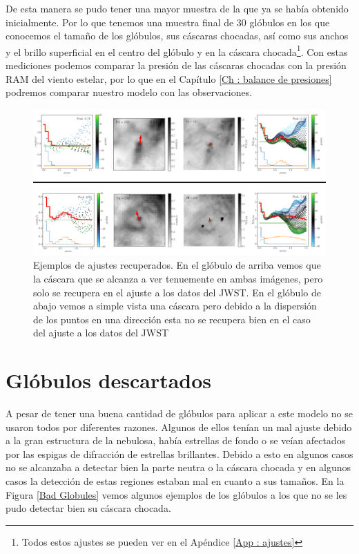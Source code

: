 \documentclass{book}
\begin{document}
De esta manera se pudo tener una mayor muestra de la que ya se había obtenido inicialmente. Por lo que tenemos una muestra final de 30 glóbulos en los que conocemos el tamaño de los glóbulos, sus cáscaras chocadas, así como  sus anchos y el brillo superficial en el centro del glóbulo y en la cáscara chocada\footnote{Todos estos ajustes se pueden ver en el Apéndice \ref{App : ajustes}}. Con estas mediciones podemos comparar la presión de las cáscaras chocadas con la presión RAM del viento estelar, por lo que en el Capítulo \ref{Ch : balance de presiones} podremos comparar nuestro modelo con las observaciones.

\begin{figure}[htb]
    \centering
    \includegraphics[width=\textwidth]{Nuevas imagenes finales/C4_Recuperados_ajustes.pdf}
    \caption{Ejemplos de ajustes recuperados. En el glóbulo de arriba vemos que la cáscara que se alcanza a ver tenuemente en ambas imágenes, pero solo se recupera en el ajuste a los datos del JWST. En el glóbulo de abajo vemos a simple vista una cáscara pero debido a la dispersión de los puntos en una dirección esta no se recupera bien en el caso del ajuste a los datos del JWST}
    \label{Recuperados Globulos}
\end{figure}

\section{Glóbulos descartados}\label{Bad globules}

A pesar de tener una buena cantidad de glóbulos para aplicar a este modelo no se usaron todos por diferentes razones. 
Algunos de ellos tenían un mal ajuste debido a la gran estructura de la nebulosa, había estrellas de fondo o se veían afectados por las espigas de difracción de estrellas brillantes.  Debido a esto en algunos casos no se alcanzaba a detectar bien la parte neutra o la cáscara chocada y en algunos casos la detección de estas regiones estaban mal en cuanto a sus tamaños. En la Figura \ref{Bad Globules} vemos algunos ejemplos de los glóbulos a los que no se les pudo detectar bien su cáscara chocada.\\
\end{document}
